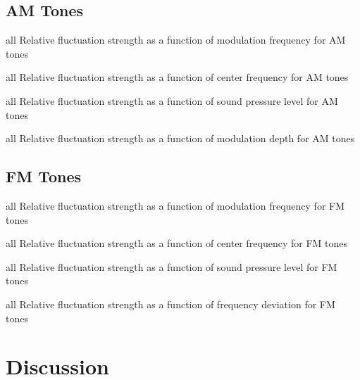\documentclass{article}
\begin{document}
\clearpage

\subsection{AM Tones} %
\label{subsec:results_am_tones}

  {all}
  {Relative fluctuation strength as a function of modulation frequency for AM
  tones}

  {all}
  {Relative fluctuation strength as a function of center frequency for AM
  tones}

  {all}
  {Relative fluctuation strength as a function of sound pressure level for AM
  tones}

  {all}
  {Relative fluctuation strength as a function of modulation depth for AM
  tones}


\subsection{FM Tones} %
\label{subsec:results_fm_tones}

  {all}
  {Relative fluctuation strength as a function of modulation frequency for FM
  tones}

  {all}
  {Relative fluctuation strength as a function of center frequency for FM
  tones}

  {all}
  {Relative fluctuation strength as a function of sound pressure level for FM
  tones}

  {all}
  {Relative fluctuation strength as a function of frequency deviation for FM
  tones}



\clearpage

\section{Discussion} %
\label{sec:discussion}
\end{document}
